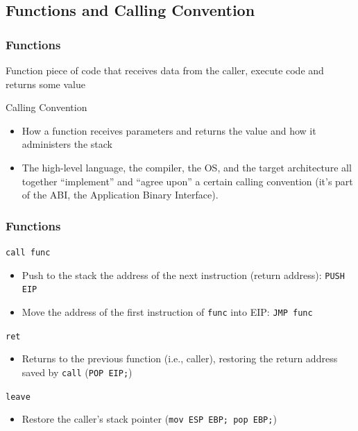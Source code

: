 \documentclass[]{beamer}
\begin{document}
\subsection{Functions and Calling Convention}
\begin{frame}
  \frametitle{Functions}
  \begin{block}{Function}
  piece of code that receives data from the caller, execute code and returns some value
  \end{block}
  \begin{block}{Calling Convention}
      \begin{itemize}
        \item How a function receives parameters and returns the value and how it administers the stack
        \item The high-level language, the compiler, the OS, and the target architecture all together ``implement'' and ``agree upon'' a certain calling convention (it's part of the \alert{ABI}, the Application Binary Interface).
     \end{itemize}
  \end{block}
\end{frame}

\begin{frame}
  \frametitle{Functions}
  \begin{block}{{\tt call func}}
  \begin{itemize}
  \item Push to the stack the address of the next instruction (return address): {\tt PUSH EIP}
  \item Move the address of the first instruction of {\tt func} into EIP: {\tt JMP func}
  \end{itemize}
  \end{block}
  \begin{block}{{\tt ret}}
  \begin{itemize}
  \item Returns to the previous function (i.e., caller), restoring the return address saved by {\tt call} ({\tt POP EIP;})
  \end{itemize}
  \end{block}
  \begin{block}{{\tt leave}}
    \begin{itemize}
    \item Restore the caller's stack pointer ({\tt mov ESP EBP; pop EBP;})
    \end{itemize}
  \end{block}
\end{frame}
\end{document}

